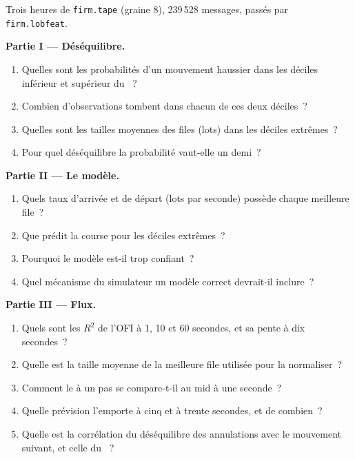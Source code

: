 \begin{problem}\label{pb:rs:order-book-features:1}
Trois heures de \texttt{firm.tape} (graine 8), 239\,528 messages, passés par \texttt{firm.lobfeat}.

\medskip\noindent\textbf{Partie I --- Déséquilibre.}
\begin{enumerate}
\item Quelles sont les probabilités d'un mouvement haussier dans les déciles inférieur et supérieur du ~?
\item Combien d'observations tombent dans chacun de ces deux déciles~?
\item Quelles sont les tailles moyennes des files (lots) dans les déciles extrêmes~?
\item Pour quel déséquilibre la probabilité vaut-elle un demi~?
\end{enumerate}

\medskip\noindent\textbf{Partie II --- Le modèle.}
\begin{enumerate}[resume]
\item Quels taux d'arrivée et de départ (lots par seconde) possède chaque meilleure file~?
\item Que prédit la course pour les déciles extrêmes~?
\item Pourquoi le modèle est-il trop confiant~?
\item Quel mécanisme du simulateur un modèle correct devrait-il inclure~?
\end{enumerate}

\medskip\noindent\textbf{Partie III --- Flux.}
\begin{enumerate}[resume]
\item Quels sont les $R^2$ de l'OFI à 1, 10 et 60 secondes, et sa pente à dix secondes~?
\item Quelle est la taille moyenne de la meilleure file utilisée pour la normaliser~?
\item Comment le  à un pas se compare-t-il au mid à une seconde~?
\item Quelle prévision l'emporte à cinq et à trente secondes, et de combien~?
\item Quelle est la corrélation du déséquilibre des annulations avec le mouvement suivant, et celle du ~?
\end{enumerate}


\end{problem}
